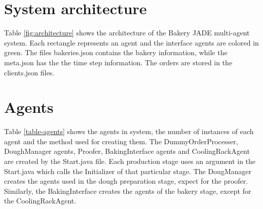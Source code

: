 \documentclass[paper=a4, fontsize=11pt]{scrartcl}
\begin{document}
		\section{System architecture}

		Table \ref{fig:architecture} shows the architecture of the Bakery JADE multi-agent system. Each rectangle represents an agent and the
		interface agents are colored in green. The files bakeries.json contains the bakery information, while the meta.json has the the time step information. The orders are stored in the clients.json files.



	\section{Agents}

		Table \ref{table-agents} shows the agents in system, the number of instances of each agent and the method used for creating them. The DummyOrderProcesser, DoughManager agents, Proofer, BakingInterface agents and CoolingRackAgent are created by the Start.java file. Each production stage uses an argument in the Start.java which calls the Initializer of that particular stage. The DougManager creates the agents used in the dough preparation stage, expect for the proofer. Similarly, the BakingInterface creates the agents of the bakery stage, except for the CoolingRackAgent.
\end{document}
